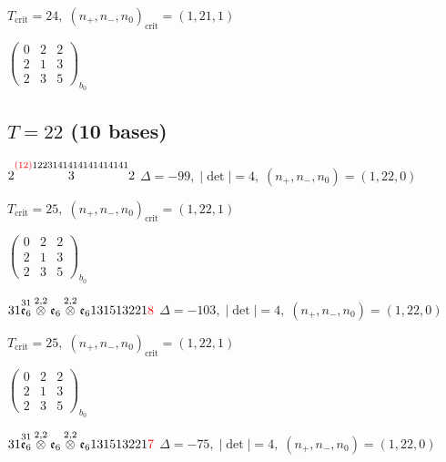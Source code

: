 \documentclass[10pt]{article}
\begin{document}
\hspace{1em}$T_{\text{crit}}=24,\; (n_+,n_-,n_0)_{\text{crit}}=(1,21,1)$

\hspace{2em}$\left(\begin{smallmatrix}0 & 2 & 2 \\ 2 & 1 & 3 \\ 2 & 3 & 5\end{smallmatrix}\right)_{\!b_0}$


\subsection*{$T = 22$ \quad (10 bases)}
\smallskip

$2\overset{\textcolor{red}{(12)}1223141414141414141}{3}2$ \quad $\Delta=-99,\; |\det|=4,\; (n_+,n_-,n_0)=(1,22,0)$

\hspace{1em}$T_{\text{crit}}=25,\; (n_+,n_-,n_0)_{\text{crit}}=(1,22,1)$

\hspace{2em}$\left(\begin{smallmatrix}0 & 2 & 2 \\ 2 & 1 & 3 \\ 2 & 3 & 5\end{smallmatrix}\right)_{\!b_0}$

\smallskip

$31\overset{31}{\mathfrak{e}_6}\overset{2,2}{\otimes}\mathfrak{e}_6\overset{2,2}{\otimes}\mathfrak{e}_6131513221\textcolor{red}{8}$ \quad $\Delta=-103,\; |\det|=4,\; (n_+,n_-,n_0)=(1,22,0)$

\hspace{1em}$T_{\text{crit}}=25,\; (n_+,n_-,n_0)_{\text{crit}}=(1,22,1)$

\hspace{2em}$\left(\begin{smallmatrix}0 & 2 & 2 \\ 2 & 1 & 3 \\ 2 & 3 & 5\end{smallmatrix}\right)_{\!b_0}$

$31\overset{31}{\mathfrak{e}_6}\overset{2,2}{\otimes}\mathfrak{e}_6\overset{2,2}{\otimes}\mathfrak{e}_6131513221\textcolor{red}{7}$ \quad $\Delta=-75,\; |\det|=4,\; (n_+,n_-,n_0)=(1,22,0)$
\end{document}
